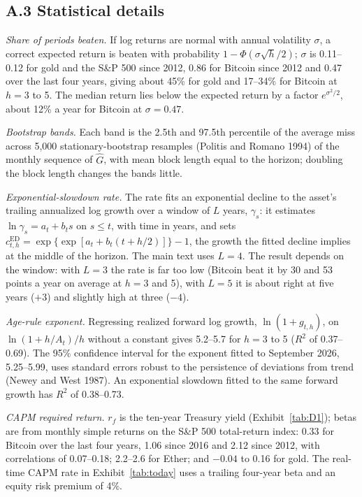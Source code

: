 \documentclass[12pt]{article}
\theoremstyle{plain}
\theoremstyle{remark}
\begin{document}
\subsection*{A.3 Statistical details}

\emph{Share of periods beaten.} If log returns are normal with annual volatility $\sigma$, a correct expected return is beaten with probability $1-\Phi(\sigma\sqrt{h}/2)$; $\sigma$ is 0.11--0.12 for gold and the S\&P 500 since 2012, 0.86 for Bitcoin since 2012 and 0.47 over the last four years, giving about 45\% for gold and 17--34\% for Bitcoin at $h=3$ to 5. The median return lies below the expected return by a factor $e^{\sigma^2/2}$, about 12\% a year for Bitcoin at $\sigma=0.47$.

\emph{Bootstrap bands.} Each band is the 2.5th and 97.5th percentile of the average miss across 5,000 stationary-bootstrap resamples (Politis and Romano 1994) of the monthly sequence of $\widehat{G}$, with mean block length equal to the horizon; doubling the block length changes the bands little.

\emph{Exponential-slowdown rate.} The rate fits an exponential decline to the asset's trailing annualized log growth over a window of $L$ years, $\gamma_s$: it estimates $\ln\gamma_s=a_t+b_t s$ on $s\le t$, with time in years, and sets $c^{\mathrm{ED}}_{t,h}=\exp\{\exp[a_t+b_t(t+h/2)]\}-1$, the growth the fitted decline implies at the middle of the horizon. The main text uses $L=4$. The result depends on the window: with $L=3$ the rate is far too low (Bitcoin beat it by 30 and 53 points a year on average at $h=3$ and 5), with $L=5$ it is about right at five years ($+3$) and slightly high at three ($-4$).

\emph{Age-rule exponent.} Regressing realized forward log growth, $\ln(1+g_{t,h})$, on $\ln(1+h/A_t)/h$ without a constant gives 5.2--5.7 for $h=3$ to 5 ($R^2$ of 0.37--0.69). The 95\% confidence interval for the exponent fitted to September 2026, 5.25--5.99, uses standard errors robust to the persistence of deviations from trend (Newey and West 1987). An exponential slowdown fitted to the same forward growth has $R^2$ of 0.38--0.73.

\emph{CAPM required return.} $r_f$ is the ten-year Treasury yield (Exhibit~\ref{tab:D1}); betas are from monthly simple returns on the S\&P 500 total-return index: 0.33 for Bitcoin over the last four years, 1.06 since 2016 and 2.12 since 2012, with correlations of 0.07--0.18; 2.2--2.6 for Ether; and $-0.04$ to 0.16 for gold. The real-time CAPM rate in Exhibit~\ref{tab:today} uses a trailing four-year beta and an equity risk premium of 4\%.
\end{document}
